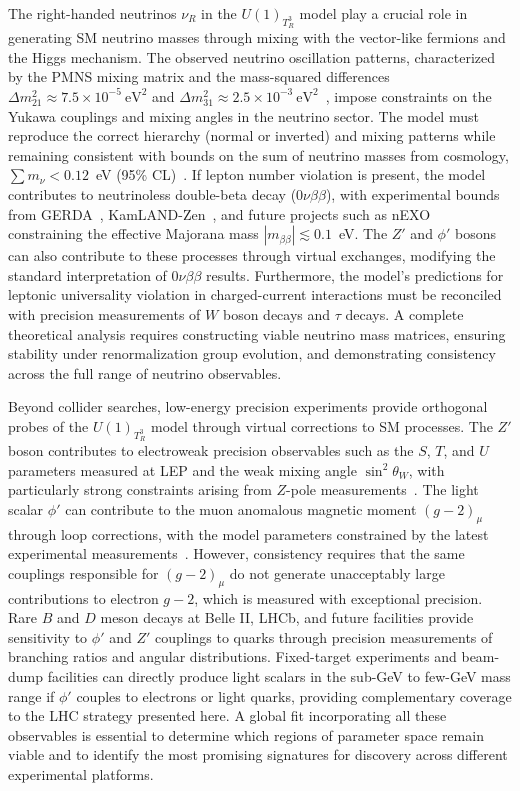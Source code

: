 The right-handed neutrinos $\nu_R$ in the $U(1)_{T^3_R}$ model play a crucial role in generating SM neutrino masses through mixing with the vector-like fermions and the Higgs mechanism. The observed neutrino oscillation patterns, characterized by the PMNS mixing matrix and the mass-squared differences $\Delta m^2_{21} \approx 7.5 \times 10^{-5}~\mathrm{eV}^2$ and $\Delta m^2_{31} \approx 2.5 \times 10^{-3}~\mathrm{eV}^2$~\cite{Capozzi:2025ovi}, impose constraints on the Yukawa couplings and mixing angles in the neutrino sector. The model must reproduce the correct hierarchy (normal or inverted) and mixing patterns while remaining consistent with bounds on the sum of neutrino masses from cosmology, $\sum m_\nu < 0.12$~eV (95\% CL)~\cite{Planck:2018vyg}. If lepton number violation is present, the model contributes to neutrinoless double-beta decay ($0\nu\beta\beta$), with experimental bounds from GERDA~\cite{GERDA:2020xhi}, KamLAND-Zen~\cite{KamLAND-Zen:2024eml}, and future projects such as nEXO~\cite{nEXO:2021ujk} constraining the effective Majorana mass $|m_{\beta\beta}| \lesssim 0.1$~eV. The $Z'$ and $\phi'$ bosons can also contribute to these processes through virtual exchanges, modifying the standard interpretation of $0\nu\beta\beta$ results. Furthermore, the model's predictions for leptonic universality violation in charged-current interactions must be reconciled with precision measurements of $W$ boson decays and $\tau$ decays. A complete theoretical analysis requires constructing viable neutrino mass matrices, ensuring stability under renormalization group evolution, and demonstrating consistency across the full range of neutrino observables.

Beyond collider searches, low-energy precision experiments provide orthogonal probes of the $U(1)_{T^3_R}$ model through virtual corrections to SM processes. The $Z'$ boson contributes to electroweak precision observables such as the $S$, $T$, and $U$ parameters measured at LEP and the weak mixing angle $\sin^2\theta_W$, with particularly strong constraints arising from $Z$-pole measurements~\cite{ALEPH:2005ab}. The light scalar $\phi'$ can contribute to the muon anomalous magnetic moment $(g-2)_\mu$ through loop corrections, with the model parameters constrained by the latest experimental measurements~\cite{Zaid:2025dxw}. However, consistency requires that the same couplings responsible for $(g-2)_\mu$ do not generate unacceptably large contributions to electron $g-2$, which is measured with exceptional precision. Rare $B$ and $D$ meson decays at Belle II, LHCb, and future facilities provide sensitivity to $\phi'$ and $Z'$ couplings to quarks through precision measurements of branching ratios and angular distributions. Fixed-target experiments and beam-dump facilities can directly produce light scalars in the sub-GeV to few-GeV mass range if $\phi'$ couples to electrons or light quarks, providing complementary coverage to the LHC strategy presented here. A global fit incorporating all these observables is essential to determine which regions of parameter space remain viable and to identify the most promising signatures for discovery across different experimental platforms. 